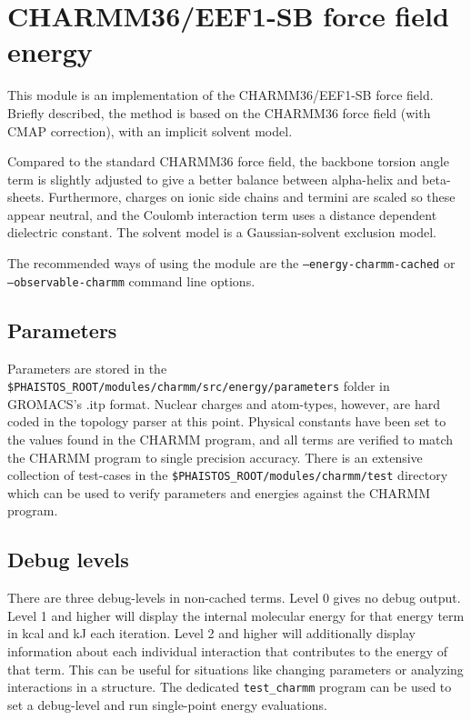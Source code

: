 \section{CHARMM36/EEF1-SB force field energy}

This module is an implementation of the CHARMM36/EEF1-SB force field\cite{doi:10.1021/ct400730n}.
Briefly described, the method is based on the CHARMM36 force field (with CMAP correction), with an implicit solvent model.

Compared to the standard CHARMM36 force field, the backbone torsion angle term is slightly adjusted to give a better balance between alpha-helix and beta-sheets.
Furthermore, charges on ionic side chains and termini are scaled so these appear neutral, and the Coulomb interaction term uses a distance dependent dielectric constant.
The solvent model is a Gaussian-solvent exclusion model.

The recommended ways of using the module are the \texttt{--energy-charmm-cached} or \texttt{--observable-charmm} command line options.

\subsection{Parameters}
Parameters are stored in the \texttt{\$PHAISTOS\_ROOT/modules/charmm/src/energy/parameters} folder in GROMACS's .itp format.
Nuclear charges and atom-types, however, are hard coded in the topology parser at this point.
Physical constants have been set to the values found in the CHARMM program, and all terms are verified to match the CHARMM program to single precision accuracy.
There is an extensive collection of test-cases in the \texttt{\$PHAISTOS\_ROOT/modules/charmm/test} directory which can be used to verify parameters and energies against the CHARMM program.


\subsection{Debug levels}
There are three debug-levels in non-cached terms.
Level 0 gives no debug output. 
Level 1 and higher will display the internal molecular energy for that energy term in kcal and kJ each iteration.
Level 2 and higher will additionally display information about each individual interaction that contributes to the energy of that term.
This can be useful for situations like changing parameters or analyzing interactions in a structure.
The dedicated \texttt{test\_charmm} program can be used to set a debug-level and run single-point energy evaluations.


